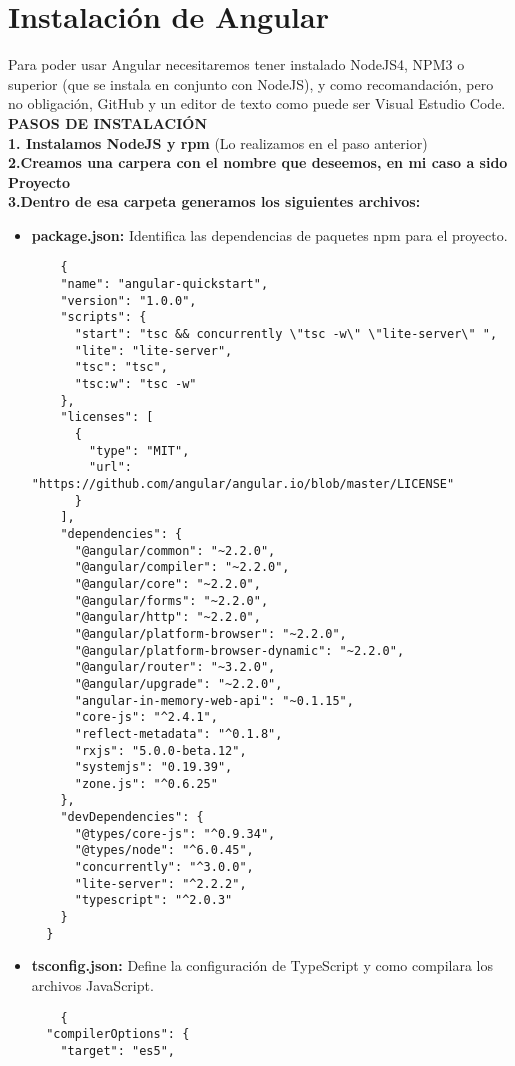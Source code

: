 \documentclass[openany]{book}
\begin{document}
\chapter{Instalación de Angular }
Para poder usar Angular necesitaremos tener instalado NodeJS4, NPM3 o superior (que se instala en conjunto con NodeJS), y como recomandación, pero no obligación, GitHub y un editor de texto como puede ser Visual Estudio Code. 
\\ \textbf{PASOS DE INSTALACIÓN}\\
\textbf{1. Instalamos NodeJS y rpm} (Lo realizamos en el paso anterior)\\
\textbf{2.Creamos una carpera con el nombre que deseemos, en mi caso a sido Proyecto\\ 3.Dentro de esa carpeta generamos los siguientes archivos:}
\begin{itemize}
  \item \textbf{package.json:} Identifica las dependencias de paquetes npm para el proyecto.
  \begin{lstlisting}
    {
    "name": "angular-quickstart",
    "version": "1.0.0",
    "scripts": {
      "start": "tsc && concurrently \"tsc -w\" \"lite-server\" ",
      "lite": "lite-server",
      "tsc": "tsc",
      "tsc:w": "tsc -w"
    },
    "licenses": [
      {
        "type": "MIT",
        "url": "https://github.com/angular/angular.io/blob/master/LICENSE"
      }
    ],
    "dependencies": {
      "@angular/common": "~2.2.0",
      "@angular/compiler": "~2.2.0",
      "@angular/core": "~2.2.0",
      "@angular/forms": "~2.2.0",
      "@angular/http": "~2.2.0",
      "@angular/platform-browser": "~2.2.0",
      "@angular/platform-browser-dynamic": "~2.2.0",
      "@angular/router": "~3.2.0",
      "@angular/upgrade": "~2.2.0",
      "angular-in-memory-web-api": "~0.1.15",
      "core-js": "^2.4.1",
      "reflect-metadata": "^0.1.8",
      "rxjs": "5.0.0-beta.12",
      "systemjs": "0.19.39",
      "zone.js": "^0.6.25"
    },
    "devDependencies": {
      "@types/core-js": "^0.9.34",
      "@types/node": "^6.0.45",
      "concurrently": "^3.0.0",
      "lite-server": "^2.2.2",
      "typescript": "^2.0.3"
    }
  }
  \end{lstlisting}
  \vspace*{5\baselineskip}
  \item \textbf{tsconfig.json:} Define la configuración de TypeScript y como compilara los archivos JavaScript.
  \begin{lstlisting}
    {
  "compilerOptions": {
    "target": "es5",

\end{lstlisting}
\end{itemize}
\end{document}
